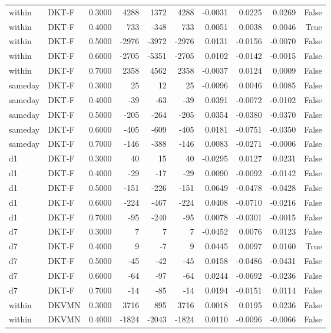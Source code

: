\begin{tabular}{llrrrrrrrr}
within & DKT-F & 0.3000 & 4288 & 1372 & 4288 & -0.0031 & 0.0225 & 0.0269 & False \\
within & DKT-F & 0.4000 & 733 & -348 & 733 & 0.0051 & 0.0038 & 0.0046 & True \\
within & DKT-F & 0.5000 & -2976 & -3972 & -2976 & 0.0131 & -0.0156 & -0.0070 & False \\
within & DKT-F & 0.6000 & -2705 & -5351 & -2705 & 0.0102 & -0.0142 & -0.0015 & False \\
within & DKT-F & 0.7000 & 2358 & 4562 & 2358 & -0.0037 & 0.0124 & 0.0009 & False \\
sameday & DKT-F & 0.3000 & 25 & 12 & 25 & -0.0096 & 0.0046 & 0.0085 & False \\
sameday & DKT-F & 0.4000 & -39 & -63 & -39 & 0.0391 & -0.0072 & -0.0102 & False \\
sameday & DKT-F & 0.5000 & -205 & -264 & -205 & 0.0354 & -0.0380 & -0.0370 & False \\
sameday & DKT-F & 0.6000 & -405 & -609 & -405 & 0.0181 & -0.0751 & -0.0350 & False \\
sameday & DKT-F & 0.7000 & -146 & -388 & -146 & 0.0083 & -0.0271 & -0.0006 & False \\
d1 & DKT-F & 0.3000 & 40 & 15 & 40 & -0.0295 & 0.0127 & 0.0231 & False \\
d1 & DKT-F & 0.4000 & -29 & -17 & -29 & 0.0090 & -0.0092 & -0.0142 & False \\
d1 & DKT-F & 0.5000 & -151 & -226 & -151 & 0.0649 & -0.0478 & -0.0428 & False \\
d1 & DKT-F & 0.6000 & -224 & -467 & -224 & 0.0408 & -0.0710 & -0.0216 & False \\
d1 & DKT-F & 0.7000 & -95 & -240 & -95 & 0.0078 & -0.0301 & -0.0015 & False \\
d7 & DKT-F & 0.3000 & 7 & 7 & 7 & -0.0452 & 0.0076 & 0.0123 & False \\
d7 & DKT-F & 0.4000 & 9 & -7 & 9 & 0.0445 & 0.0097 & 0.0160 & True \\
d7 & DKT-F & 0.5000 & -45 & -42 & -45 & 0.0158 & -0.0486 & -0.0431 & False \\
d7 & DKT-F & 0.6000 & -64 & -97 & -64 & 0.0244 & -0.0692 & -0.0236 & False \\
d7 & DKT-F & 0.7000 & -14 & -85 & -14 & 0.0194 & -0.0151 & 0.0114 & False \\
within & DKVMN & 0.3000 & 3716 & 895 & 3716 & 0.0018 & 0.0195 & 0.0236 & False \\
within & DKVMN & 0.4000 & -1824 & -2043 & -1824 & 0.0110 & -0.0096 & -0.0066 & False \\

\end{tabular}
